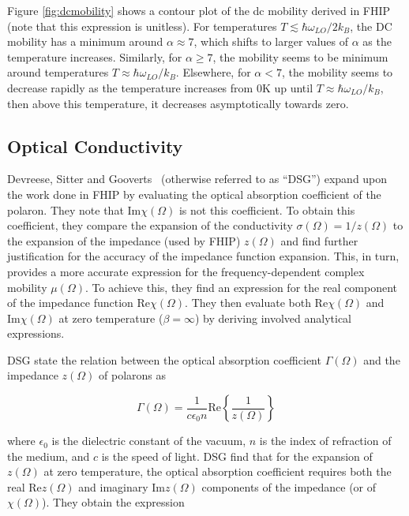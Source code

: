 Figure \ref{fig:dcmobility} shows a contour plot of the dc mobility derived in FHIP (note that this expression is unitless). For temperatures $T \lesssim \hbar \omega_{LO} / 2 k_B$, the DC mobility has a minimum around $\alpha \approx 7$, which shifts to larger values of $\alpha$ as the temperature increases. Similarly, for $\alpha \geq 7$, the mobility seems to be minimum around temperatures $T \approx \hbar \omega_{LO} / k_B$. Elsewhere, for $\alpha < 7$, the mobility seems to decrease rapidly as the temperature increases from $0$K up until $T \approx \hbar \omega_{LO} / k_B$, then above this temperature, it decreases asymptotically towards zero.

\subsection{Optical Conductivity}
\label{subsec:2-3-2}

Devreese, Sitter and Gooverts~\cite{devreese_optical_1972} (otherwise referred to as ``DSG'') expand upon the work done in FHIP by evaluating the optical absorption coefficient of the polaron. They note that $\text{Im}\chi(\Omega)$ is not this coefficient. To obtain this coefficient, they compare the expansion of the conductivity $\sigma(\Omega) = 1 / z(\Omega)$ to the expansion of the impedance (used by FHIP) $z(\Omega)$ and find further justification for the accuracy of the impedance function expansion. This, in turn, provides a more accurate expression for the frequency-dependent complex mobility $\mu(\Omega)$. To achieve this, they find an expression for the real component of the impedance function $\text{Re}\chi(\Omega)$. They then evaluate both $\text{Re}\chi(\Omega)$ and $\text{Im}\chi(\Omega)$ at zero temperature ($\beta = \infty$) by deriving involved analytical expressions. 

DSG state the relation between the optical absorption coefficient $\Gamma(\Omega)$ and the impedance $z(\Omega)$ of polarons as

\begin{equation}
    \Gamma(\Omega) = \frac{1}{c\epsilon_0 n} \text{Re} \left\{ \frac{1}{z(\Omega)} \right\}
\end{equation}

where $\epsilon_0$ is the dielectric constant of the vacuum, $n$ is the index of refraction of the medium, and $c$ is the speed of light. DSG find that for the expansion of $z(\Omega)$ at zero temperature, the optical absorption coefficient requires both the real $\text{Re} z(\Omega)$ and imaginary $\text{Im} z(\Omega)$ components of the impedance (or of $\chi(\Omega)$). They obtain the expression

